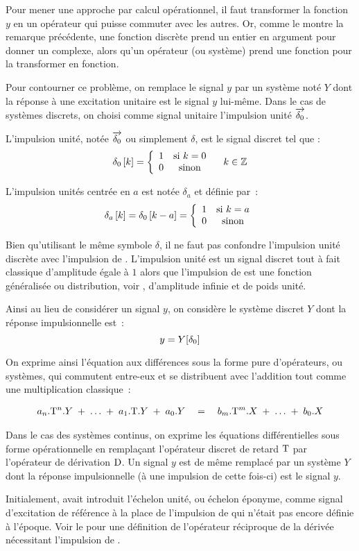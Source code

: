 Pour mener une approche par calcul opérationnel, il faut transformer
la fonction $y$ en un opérateur qui puisse commuter avec les autres.
Or, comme le montre la remarque précédente, une fonction discrète prend
un entier en argument pour donner un complexe, alors qu'un opérateur
(ou système) prend une fonction pour la transformer en fonction.

Pour contourner ce problème, on remplace le signal $y$ par un système
noté $Y$ dont la réponse à une excitation unitaire est le signal $y$
lui-même. Dans le cas de systèmes discrets, on choisi comme signal
unitaire l'impulsion unité $\d0$.

\begin{definition}
  \label{def:impulsion_unite}
  L'impulsion unité, notée $\d0$ ou simplement $\delta$, est le signal discret tel que :
  $$
  \delta_0\left[k\right]=\left\{\begin{array}{cc} {1} & {\text{si } k=0}\\ {0} & {\text{sinon}}\\ \end{array}\right. \quad k\in\mathbb{Z}
  $$

  L'impulsion unités centrée en $a$ est notée $\delta_a$ et définie par~:
  $$
  \delta_a\left[k\right]=\delta_0\left[k-a\right] = \left\{\begin{array}{cc} {1} & {\text{si } k=a}\\ {0} & {\text{sinon}}\\ \end{array}\right.
  $$

  Bien qu'utilisant le même symbole $\delta$, il ne faut pas confondre
  l'impulsion unité discrète avec l'impulsion de \Dirac. L'impulsion
  unité est un signal discret tout à fait classique d'amplitude égale
  à $1$ alors que l'impulsion de \Dirac{} est une fonction généralisée
  ou distribution, voir , d'amplitude infinie et de
  poids unité.
\end{definition}

Ainsi au lieu de considérer un signal $y$, on considère le système discret $Y$ dont la réponse impulsionnelle est~:
\begin{equation}
  y = Y\!\left[\delta_0\right]
\end{equation}



On exprime ainsi l'équation aux différences sous la forme pure
d'opérateurs, ou systèmes, qui commutent entre-eux et se distribuent
avec l'addition tout comme une multiplication classique~:

\begin{eqnarray}
  a_n.\mathrm{T}^n.Y\; +\; \ldots \;+\; a_1.\mathrm{T}.Y \;+\; a_0.Y \quad  = \quad b_m.\mathrm{T}^m.X \;+\; \ldots \;+\; b_0.X
\end{eqnarray}

\begin{remarque}
  Dans le cas des systèmes continus, on exprime les équations
  différentielles sous forme opérationnelle en remplaçant l'opérateur
  discret de retard $\mathrm{T}$ par l'opérateur de dérivation $\mathrm{D}$. Un
  signal $y$ est de même remplacé par un système $Y$ dont la réponse
  impulsionnelle (à une impulsion de \Dirac{} cette fois-ci) est le
  signal $y$.

  Initialement, \Heaviside{} avait introduit l'échelon unité, ou
  échelon éponyme, comme signal d'excitation de référence à la place
  de l'impulsion de \Dirac{} qui n'était pas encore définie à
  l'époque. Voir le  pour une définition de
  l'opérateur réciproque de la dérivée nécessitant l'impulsion de
  \Dirac{}.
\end{remarque}

